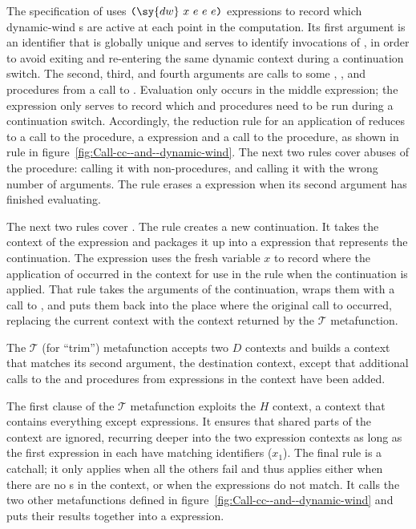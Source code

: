 The specification of  uses
$\texttt{(}\sy{dw}~x~e~e~e\texttt{)}$
expressions to record which dynamic-wind s are active at
each point in the computation. Its first argument is an identifier
that is globally unique and serves to identify invocations of
, in order to avoid exiting and re-entering the
same dynamic context during a continuation switch. The second, third,
and fourth arguments are calls to some , , and
 procedures from a call to . Evaluation only
occurs in the middle expression; the  expression only
serves to record which  and  procedures need to be run during a
continuation switch. Accordingly, the reduction rule for an
application of  reduces to a call to the
 procedure, a  expression and a call to the
 procedure, as
shown in rule  in
figure~\ref{fig:Call-cc--and--dynamic-wind}. The next two rules cover
abuses of the  procedure: calling it with
non-procedures, and calling it with the wrong number of arguments. The
 rule erases a  expression when its second
argument has finished evaluating.

The next two rules cover . The rule
 creates a new continuation. It takes the context
of the  expression and packages it up into a
 expression that represents the continuation. The
 expression uses the fresh variable $x$ to record
where the application of  occurred in the context for
use in the  rule when the continuation is applied.
That rule takes the arguments of the continuation, wraps them with a
call to , and puts them back into the place where the
original call to  occurred, replacing the current
context with the context returned by the $\mathscr{T}$ metafunction.

The $\mathscr{T}$ (for ``trim'') metafunction accepts two $D$ contexts and
builds a context that matches its second argument, the destination
context, except that additional calls to the  and
 procedures
from  expressions in the context have been added.

The first clause of the $\mathscr{T}$ metafunction exploits the
$H$ context, a context that contains everything except
 expressions. It ensures that shared parts of the
 context are ignored, recurring deeper into the
two expression contexts as long as the first  expression in
each have matching identifiers ($x_1$). The final rule is a
catchall; it only applies when all the others fail and thus applies
either when there are no s in the context, or when the
 expressions do not match. It calls the two other
metafunctions defined in figure~\ref{fig:Call-cc--and--dynamic-wind} and
puts their results together into a  expression.

